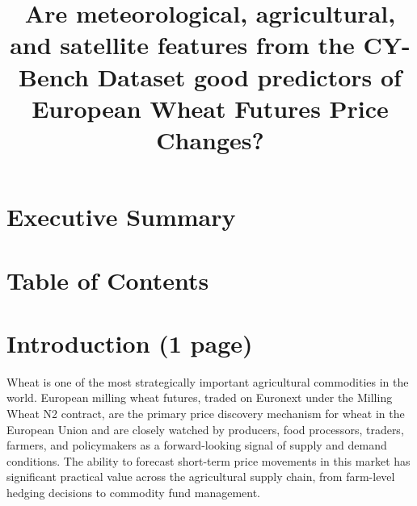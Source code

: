 \documentclass[pdflatex,sn-mathphys-num, oneside]{sn-jnl}%
\theoremstyle{thmstyleone}%
\theoremstyle{thmstyletwo}%
\theoremstyle{thmstylethree}%
\begin{document}
\title[Article Title]{Are meteorological, agricultural, and satellite features from the CY-Bench Dataset good predictors of European Wheat Futures Price Changes?}


\author{}
\author{}
\author{}



\maketitle

\clearpage

\section{Executive Summary}\label{sec1}

\clearpage

\section{Table of Contents}\label{sec2}

\clearpage

\section{Introduction (1 page)}\label{sec3}
Wheat is one of the most strategically important agricultural commodities in the world. European milling wheat futures, traded on Euronext under the Milling Wheat N2 contract, are the primary price discovery mechanism for wheat in the European Union and are closely watched by producers, food processors, traders, farmers, and policymakers as a forward-looking signal of supply and demand conditions. The ability to forecast short-term price movements in this market has significant practical value across the agricultural supply chain, from farm-level hedging decisions to commodity fund management.
\end{document}
